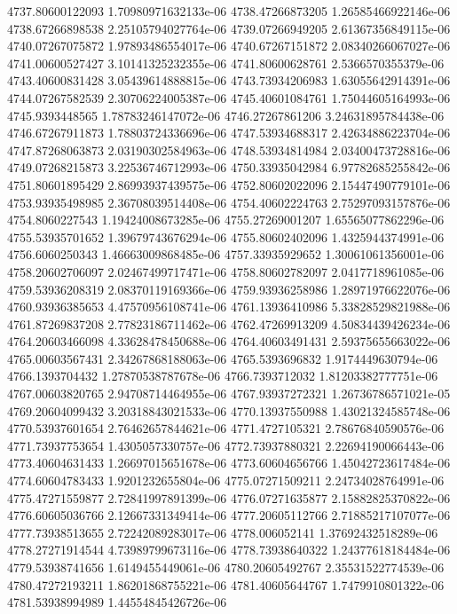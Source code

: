 {4737.80600122093 1.70980971632133e-06
4738.47266873205 1.26585466922146e-06
4738.67266898538 2.25105794027764e-06
4739.07266949205 2.61367356849115e-06
4740.07267075872 1.97893486554017e-06
4740.67267151872 2.08340266067027e-06
4741.00600527427 3.10141325232355e-06
4741.80600628761 2.5366570355379e-06
4743.40600831428 3.05439614888815e-06
4743.73934206983 1.63055642914391e-06
4744.07267582539 2.30706224005387e-06
4745.40601084761 1.75044605164993e-06
4745.9393448565 1.78783246147072e-06
4746.27267861206 3.24631895784438e-06
4746.67267911873 1.78803724336696e-06
4747.53934688317 2.42634886223704e-06
4747.87268063873 2.03190302584963e-06
4748.53934814984 2.03400473728816e-06
4749.07268215873 3.22536746712993e-06
4750.33935042984 6.97782685255842e-06
4751.80601895429 2.86993937439575e-06
4752.80602022096 2.15447490779101e-06
4753.93935498985 2.36708039514408e-06
4754.40602224763 2.75297093157876e-06
4754.8060227543 1.19424008673285e-06
4755.27269001207 1.65565077862296e-06
4755.53935701652 1.39679743676294e-06
4755.80602402096 1.4325944374991e-06
4756.6060250343 1.46663009868485e-06
4757.33935929652 1.30061061356001e-06
4758.20602706097 2.02467499717471e-06
4758.80602782097 2.0417718961085e-06
4759.53936208319 2.08370119169366e-06
4759.93936258986 1.28971976622076e-06
4760.93936385653 4.47570956108741e-06
4761.13936410986 5.33828529821988e-06
4761.87269837208 2.77823186711462e-06
4762.47269913209 4.50834439426234e-06
4764.20603466098 4.33628478450688e-06
4764.40603491431 2.59375655663022e-06
4765.00603567431 2.34267868188063e-06
4765.5393696832 1.9174449630794e-06
4766.1393704432 1.27870538787678e-06
4766.7393712032 1.81203382777751e-06
4767.00603820765 2.94708714464955e-06
4767.93937272321 1.26736786571021e-05
4769.20604099432 3.20318843021533e-06
4770.13937550988 1.43021324585748e-06
4770.53937601654 2.76462657844621e-06
4771.4727105321 2.78676840590576e-06
4771.73937753654 1.4305057330757e-06
4772.73937880321 2.22694190066443e-06
4773.40604631433 1.26697015651678e-06
4773.60604656766 1.45042723617484e-06
4774.60604783433 1.9201232655804e-06
4775.07271509211 2.24734028764991e-06
4775.47271559877 2.72841997891399e-06
4776.07271635877 2.15882825370822e-06
4776.60605036766 2.12667331349414e-06
4777.20605112766 2.71885217107077e-06
4777.73938513655 2.72242089283017e-06
4778.006052141 1.37692432518289e-06
4778.27271914544 4.73989799673116e-06
4778.73938640322 1.24377618184484e-06
4779.53938741656 1.6149455449061e-06
4780.20605492767 2.35531522774539e-06
4780.47272193211 1.86201868755221e-06
4781.40605644767 1.7479910801322e-06
4781.53938994989 1.44554845426726e-06
}
